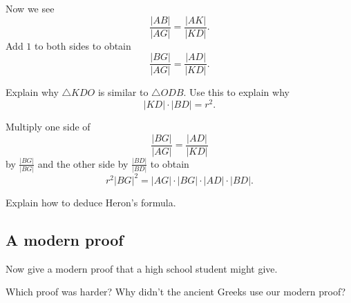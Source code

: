 \documentclass[nooutcomes]{ximera}
\begin{document}
\begin{question}
Now we see 
\[
\frac{|AB|}{|AG|} = \frac{|AK|}{|KD|}.
\]
Add $1$ to both sides to obtain
\[
\frac{|BG|}{|AG|} = \frac{|AD|}{|KD|}.
\]
\end{question}


\begin{question}
Explain why $\triangle KDO$ is similar to $\triangle ODB$. Use this to explain why
\[
|KD|\cdot|BD| = r^2.
\]
\end{question}

\begin{question}
Multiply one side of  
\[
\frac{|BG|}{|AG|} = \frac{|AD|}{|KD|}
\]
 by $\frac{|BG|}{|BG|}$ and the other side by $\frac{|BD|}{|BD|}$ to obtain
\[
r^2|BG|^2 = |AG|\cdot |BG|\cdot |AD|\cdot |BD|.
\]
\end{question}


\begin{question}
Explain how to deduce Heron's formula.
\end{question}


\subsection*{A modern proof}

\begin{question}
Now give a modern proof that a high school student might give. 
\end{question}

\begin{question}
Which proof was harder? Why didn't the ancient Greeks use our modern
proof?
\end{question}
\end{document}
